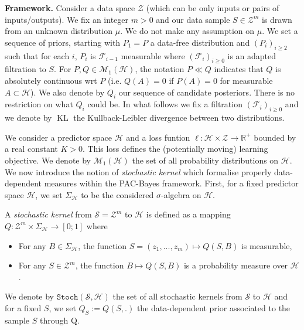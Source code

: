 \textbf{Framework.} Consider a data space $\mathcal{Z}$ (which can be only inputs or pairs of inputs/outputs). We fix an integer $m>0$ and our data sample $S\in\mathcal{Z}^m$ is drawn from an unknown distribution $\mu$. We do not make any assumption on $\mu$.  We set a sequence of priors, starting with $P_1=P$ a data-free distribution and $(P_i)_{i\geq 2}$ such that for each $i$, $P_i$ is $\mathcal{F}_{i-1}$ measurable where $(\mathcal{F}_i)_{i\geq 0}$ is an adapted filtration to $S$.
For $P,Q \in \mathcal{M}_{1}\left(\mathcal{H}\right)$, the notation $P \ll Q$ indicates that $Q$ is absolutely continuous wrt $P$ (i.e. $Q(A) = 0$ if $P(A) = 0$ for measurable $A \subset \mathcal{H}$).
We also denote by $Q_i$ our sequence of candidate posteriors. There is no restriction on what $Q_i$ could be.
In what follows we fix a filtration $(\mathcal{F}_i)_{i\geq 0}$ and we denote by $\operatorname{KL}$ the Kullback-Leibler divergence between two distributions.

We consider a predictor space $\mathcal{H}$ and a loss funtion $\ell: \mathcal{H}\times \mathcal{Z} \rightarrow \mathbb{R}^+$ bounded by a real constant $K>0$. This loss defines the (potentially moving) learning objective. We denote by $\mathcal{M}_1(\mathcal{H})$ the set of all probability distributions on $\mathcal{H}$.
 We now introduce the notion of \emph{stochastic kernel} \citep{rivasplata2020pac} which formalise properly data-dependent measures within the PAC-Bayes framework. First, for a fixed predictor space $\mathcal{H}$, we set $\Sigma_{\mathcal{H}}$ to be the considered $\sigma$-algebra on $\mathcal{H}$.

\begin{definition}
    A \emph{stochastic kernel} from $\mathcal{S}=\mathcal{Z}^m$ to $\mathcal{H}$ is defined as a mapping $Q: \mathcal{Z}^m\times \Sigma_{\mathcal{H}} \rightarrow [0;1]$ where
    \begin{itemize}
        \item For any $B\in \Sigma_{\mathcal{H}}$, the function  $S=(z_1,...,z_m)\mapsto Q(S,B)$ is measurable,
        \item For any $S\in\mathcal{Z}^m$, the function $B\mapsto Q(S,B)$ is a probability measure over $\mathcal{H}$.
    \end{itemize}
    We denote by $\texttt{Stoch}(\mathcal{S},\mathcal{H})$ the set of all stochastic kernels from $\mathcal{S}$ to $\mathcal{H}$ and for a fixed $S$, we set $Q_S:= Q(S,.)$ the data-dependent prior associated to the sample $S$ through Q.
\end{definition}

